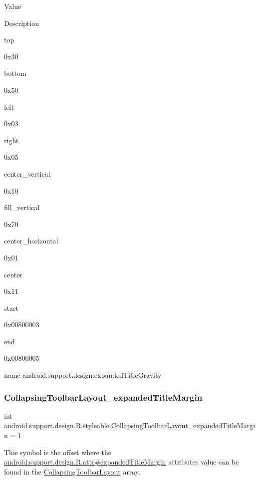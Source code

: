 Value

Description 

{\ttfamily top}

0x30

{\ttfamily bottom}

0x50

{\ttfamily left}

0x03

{\ttfamily right}

0x05

{\ttfamily center\+\_\+vertical}

0x10

{\ttfamily fill\+\_\+vertical}

0x70

{\ttfamily center\+\_\+horizontal}

0x01

{\ttfamily center}

0x11

{\ttfamily start}

0x00800003

{\ttfamily end}

0x00800005

name android.\+support.\+design\+:expanded\+Title\+Gravity \mbox{\label{classandroid_1_1support_1_1design_1_1R_1_1styleable_a7f6c3d7589ba466516400c94b09af6dd}} 
\subsubsection{\texorpdfstring{Collapsing\+Toolbar\+Layout\+\_\+expanded\+Title\+Margin}{CollapsingToolbarLayout\_expandedTitleMargin}}
{\footnotesize\ttfamily int android.\+support.\+design.\+R.\+styleable.\+Collapsing\+Toolbar\+Layout\+\_\+expanded\+Title\+Margin = 1\hspace{0.3cm}{\ttfamily [static]}}

This symbol is the offset where the \hyperlink{classandroid_1_1support_1_1design_1_1R_1_1attr_a0fccc0bfb61b2986719bdae726085c6c}{android.\+support.\+design.\+R.\+attr\#expanded\+Title\+Margin} attribute\textquotesingle{}s value can be found in the \hyperlink{classandroid_1_1support_1_1design_1_1R_1_1styleable_a4a019838b1c3daad84b4ffff397db335}{Collapsing\+Toolbar\+Layout} array.

